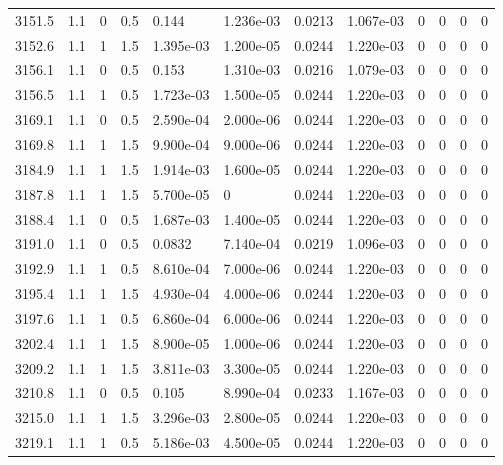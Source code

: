 \documentclass[preview]{standalone}
\begin{document}
{{{{{{{{{{{{{{{{{{\begin{tabular}{L{1.2cm}C{1.2cm} C{0.3cm}C{0.5cm} C{1.4cm}C{1.4cm} C{1.4cm}C{1.4cm} C{1.6cm}C{1.6cm} C{1.6cm}C{1.6cm}}
  3151.5  &   1.1  & 0     & 0.5 &  0.144  & 1.236e-03  &  0.0213&   1.067e-03& 0 & 0   &  0 & 0  \\ 
  3152.6  &   1.1  & 1     & 1.5 &  1.395e-03  & 1.200e-05  &  0.0244&   1.220e-03& 0 & 0   &  0 & 0  \\ 
  3156.1  &   1.1  & 0     & 0.5 &  0.153  & 1.310e-03  &  0.0216&   1.079e-03& 0 & 0   &  0 & 0  \\ 
  3156.5  &   1.1  & 1     & 0.5 &  1.723e-03  & 1.500e-05  &  0.0244&   1.220e-03& 0 & 0   &  0 & 0  \\ 
  3169.1  &   1.1  & 0     & 0.5 &  2.590e-04  & 2.000e-06  &  0.0244&   1.220e-03& 0 & 0   &  0 & 0  \\ 
  3169.8  &   1.1  & 1     & 1.5 &  9.900e-04  & 9.000e-06  &  0.0244&   1.220e-03& 0 & 0   &  0 & 0  \\ 
  3184.9  &   1.1  & 1     & 1.5 &  1.914e-03  & 1.600e-05  &  0.0244&   1.220e-03& 0 & 0   &  0 & 0  \\ 
  3187.8  &   1.1  & 1     & 1.5 &  5.700e-05  & 0  &  0.0244&   1.220e-03& 0 & 0   &  0 & 0  \\ 
  3188.4  &   1.1  & 0     & 0.5 &  1.687e-03  & 1.400e-05  &  0.0244&   1.220e-03& 0 & 0   &  0 & 0  \\ 
  3191.0  &   1.1  & 0     & 0.5 &  0.0832  & 7.140e-04  &  0.0219&   1.096e-03& 0 & 0   &  0 & 0  \\ 
  3192.9  &   1.1  & 1     & 0.5 &  8.610e-04  & 7.000e-06  &  0.0244&   1.220e-03& 0 & 0   &  0 & 0  \\ 
  3195.4  &   1.1  & 1     & 1.5 &  4.930e-04  & 4.000e-06  &  0.0244&   1.220e-03& 0 & 0   &  0 & 0  \\ 
  3197.6  &   1.1  & 1     & 0.5 &  6.860e-04  & 6.000e-06  &  0.0244&   1.220e-03& 0 & 0   &  0 & 0  \\ 
  3202.4  &   1.1  & 1     & 1.5 &  8.900e-05  & 1.000e-06  &  0.0244&   1.220e-03& 0 & 0   &  0 & 0  \\ 
  3209.2  &   1.1  & 1     & 1.5 &  3.811e-03  & 3.300e-05  &  0.0244&   1.220e-03& 0 & 0   &  0 & 0  \\ 
  3210.8  &   1.1  & 0     & 0.5 &  0.105  & 8.990e-04  &  0.0233&   1.167e-03& 0 & 0   &  0 & 0  \\ 
  3215.0  &   1.1  & 1     & 1.5 &  3.296e-03  & 2.800e-05  &  0.0244&   1.220e-03& 0 & 0   &  0 & 0  \\ 
  3219.1  &   1.1  & 1     & 0.5 &  5.186e-03  & 4.500e-05  &  0.0244&   1.220e-03& 0 & 0   &  0 & 0  \\ 

\end{tabular}}}}}}}}}}}}}}}}}}}
\end{document}
